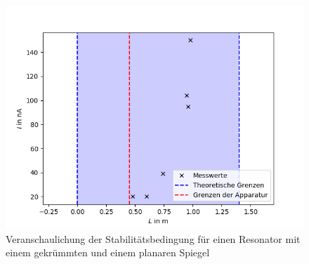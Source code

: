 \begin{figure}[h!]
	\centering
	\includegraphics[width=.7\textwidth]{PlotFlat2.png}
	\caption{Veranschaulichung der Stabilitätsbedingung für einen Resonator mit einem gekrümmten und einem planaren Spiegel}
	\label{fig:flat}
\end{figure}